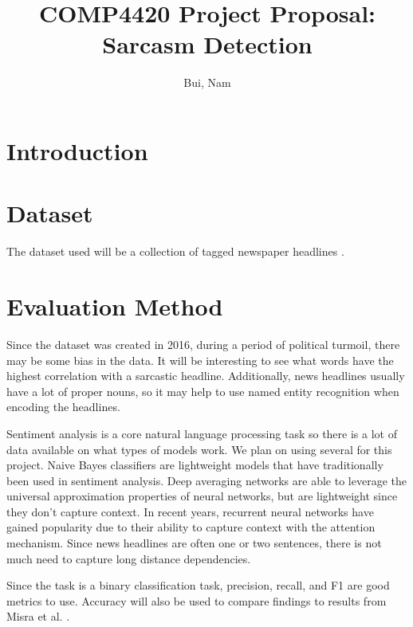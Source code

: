 \documentclass[11pt]{article}
\title{COMP4420 Project Proposal: Sarcasm Detection}
\author{
    Bui, Nam \\
    \email{nam\_bui@student.uml.edu}
}
\begin{document}
\maketitle

\section{Introduction}



\section{Dataset}

The dataset used will be a collection of
tagged newspaper headlines \cite{misra2023Sarcasm}.



\section{Evaluation Method}

Since the dataset was created in 2016,
during a period of political turmoil,
there may be some bias in the data.
It will be interesting to see what words
have the highest correlation with a sarcastic headline.
Additionally, news headlines usually have a lot of proper nouns,
so it may help to use named entity recognition when encoding the headlines.

Sentiment analysis is a core natural language processing task
so there is a lot of data available on what types of models work.
We plan on using several for this project.
Naive Bayes classifiers are lightweight models that have
traditionally been used in sentiment analysis.
Deep averaging networks are able to leverage the universal approximation properties
of neural networks, but are lightweight since they don't capture context.
In recent years, recurrent neural networks have gained popularity
due to their ability to capture context with the attention mechanism.
Since news headlines are often one or two sentences,
there is not much need to capture long distance dependencies.

Since the task is a binary classification task,
precision, recall, and F1 are good metrics to use.
Accuracy will also be used to compare findings
to results from Misra et al. \cite{misra2023Sarcasm}.

\printbibliography
\end{document}
